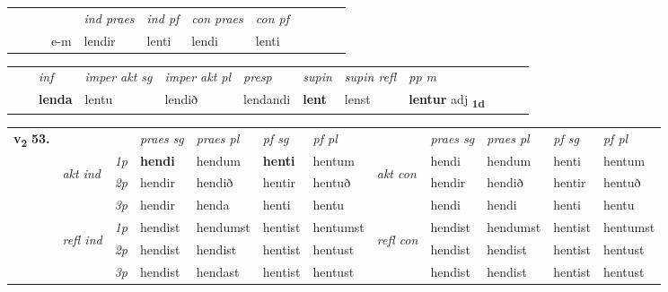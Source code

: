 \begin{tabular}{llllllllllll}
 & &  & &  \textit{ind praes} & \textit{ind pf} & \textit{con praes} & \textit{con pf} \\*
&  & & e-m & lendir & lenti & lendi & lenti \\*
\cmidrule{5-9}
\end{tabular}


\begin{tabular}{llllllllllll}
 & & \textit{inf} & \textit{imper akt sg} & \textit{imper akt pl}   & \textit{presp} & \textit{supin} & \textit{supin refl} & \textit{pp m}     \\*
  & & \textbf{lenda} & lentu  & lendið   & lendandi &  \textbf{lent} & lenst & \textbf{lentur} adj \textbf{\textsubscript{1d}} \\*
\cmidrule{1-12}
\end{tabular}



\begin{tabular}{llllllllllll} \toprule
\multirow{4}{*}{{{\textbf{v{\textsubscript{2}}} \Large{\textbf{53.}}}}}  & &   &  \textit{praes sg}  & \textit{praes pl}  &\textit{ pf sg} & \textit{pf pl} &  &  \textit{praes sg}  & \textit{praes pl}  & \textit{pf sg} & \textit{pf pl } \\*
	\cmidrule{4-7} \cmidrule{9-12}
 & \multirow{3}{*}{\begin{turn}{90}\textit{akt ind}\end{turn}} & {\textit{1p}} & \textbf{hendi} & hendum    & \textbf{henti} & hentum & \multirow{3}{*}{\begin{turn}{90}\textit{akt con}\end{turn}} &hendi & hendum & henti & hentum\\*
& &  {\textit{2p}} &  hendir  & hendið   & hentir & hentuð & & hendir & hendið & hentir & hentuð \\*
& &  {\textit{3p}} & hendir & henda   & henti & hentu & & hendi & hendi& henti & hentu  \\*
\cmidrule{4-7} \cmidrule{9-12}
 &\multirow{3}{*}{\begin{turn}{90}\textit{refl ind}\end{turn}} & {\textit{1p}} & hendist & hendumst    & hentist & hentumst & \multirow{3}{*}{\begin{turn}{90}\textit{refl con}\end{turn}}  &hendist & hendumst & hentist & hentumst\\*
 &&  {\textit{2p}} &  hendist  & hendist   & hentist & hentust & &hendist & hendist & hentist & hentust \\*
& &  {\textit{3p}} & hendist & hendast   & hentist & hentust & & hendist & hendist& hentist & hentust  \\*
\cmidrule{4-7} \cmidrule{9-12}
\end{tabular}


